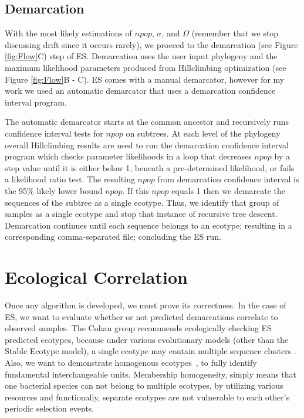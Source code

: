 \subsection*{Demarcation}
With the most likely estimations of $npop$, $\sigma$, and $\Omega$ (remember that we stop discussing drift since it occurs rarely), we proceed to the demarcation (see Figure \ref{fig:Flow}C) step of ES.
Demarcation uses the user input phylogeny and the maximum likelihood parameters produced from Hillclimbing optimization (see Figure \ref{fig:Flow}B - C).
ES comes with a manual demarcator, however for my work we used an automatic demarcator that uses a demarcation confidence interval program.

The automatic demarcator starts at the common ancestor and recursively runs confidence interval tests for $npop$ on subtrees.
At each level of the phylogeny overall Hillclimbing results are used to run the demarcation confidence interval program which checks parameter likelihoods in a loop that decreases $npop$ by a step value until it is either below 1, beneath a pre-determined likelihood, or fails a likelihood ratio test.
The resulting $npop$ from demarcation confidence interval is the 95\% likely lower bound $npop$.
If this $npop$ equals 1 then we demarcate the sequences of the subtree as a single ecotype.
Thus, we identify that group of samples as a single ecotype and stop that instance of recursive tree descent.
Demarcation continues until each sequence belongs to an ecotype; resulting in a corresponding comma-separated file; concluding the ES run.

\section{Ecological Correlation}
Once any algorithm is developed, we must prove its correctness.
In the case of ES, we want to evaluate whether or not predicted demarcations correlate to observed samples.
The Cohan group recommends ecologically checking ES predicted ecotypes, because under various evolutionary models (other than the Stable Ecotype model), a single ecotype may contain multiple sequence clusters \cite{koeppel2008identifying, connor2010ecology}.
Also, we want to demonstrate homogenous ecotypes~\cite{wiedenbeckHGT}, to fully identify fundamental interchangeable units.
Membership homogeneity, simply means that one bacterial species can not belong to multiple ecotypes, by utilizing various resources and functionally, separate ecotypes are not vulnerable to each other's periodic selection events.

